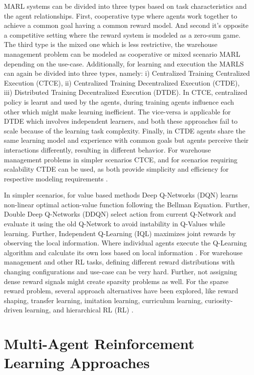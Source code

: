 \documentclass{article}
\begin{document}
MARL systems can be divided into three types based on task characteristics and the agent relationships.
First, cooperative type where agents work together to achieve a common goal having a common reward model.
And second it's opposite a competitive setting where the reward system is modeled as a zero-sum game.
The third type is the mixed one which is less restrictive, the warehouse management problem can be modeled as cooperative or mixed scenario MARL depending on the use-case.
Additionally, for learning and execution the MARLS can again be divided into three types, namely: i) Centralized Training Centralized Execution (CTCE), ii) Centralized Training Decentralized Execution (CTDE), iii) Distributed Training Decentralized Execution (DTDE).
In CTCE, centralized policy is learnt and used by the agents, during training agents influence each other which might make learning inefficient.
The vice-versa is applicable for DTDE which involves independent learners, and both these approaches fail to scale because of the learning task complexity.
Finally, in CTDE agents share the same learning model and experience with common goals but agents perceive their interactions differently, resulting in different behavior.
For warehouse management problems in simpler scenarios CTCE, and for scenarios requiring scalability CTDE can be used, as both provide simplicity and efficiency for respective modeling requirements \cite{wen2021dtde}.


In simpler scenarios, for value based methods Deep Q-Networks (DQN) learns non-linear optimal action-value function following the Bellman Equation.
Further, Double Deep Q-Networks (DDQN) select action from current Q-Network and evaluate it using the old Q-Network to avoid instability in Q-Values while learning.
Further, Independent Q-Learning (IQL) maximizes joint rewards by observing the local information.
Where individual agents execute the Q-Learning algorithm and calculate its own loss based on local information \cite{sutton2018reinforcement, wen2021dtde}.
For warehouse management and other RL tasks, defining different reward distributions with changing configurations and use-case can be very hard.
Further, not assigning dense reward signals might create sparsity problems as well.
For the sparse reward problem, several approach alternatives have been explored, like reward shaping, transfer learning, imitation learning, curriculum learning, curiosity-driven learning, and hierarchical RL (RL) \cite{huang2020action}.


\section{Multi-Agent Reinforcement Learning Approaches}
\end{document}
